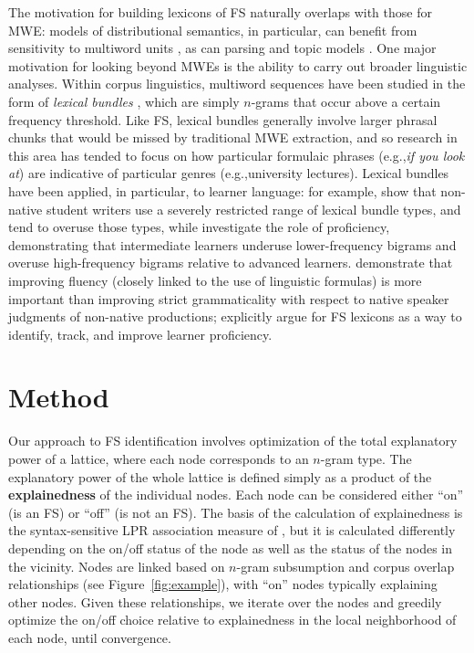 \documentclass[11pt,letterpaper]{article}
\makeatletter
\def \eg {e.g.,\@ }
\newcommand{\termdef}[1]{\textbf{#1}\xspace}
\newcommand{\figref}[2][]{Figure#1~\ref{#2}\xspace}
\makeatother
\begin{document}
The motivation for building lexicons of FS naturally overlaps with those for MWE: models of distributional semantics, in particular, can benefit from sensitivity to multiword units \cite{Cohen:Widdows:2009}, as can parsing \cite{Constant16} and topic models \cite{Lau+:2012b}. One major motivation for looking beyond MWEs is the ability to carry out broader linguistic analyses. Within corpus linguistics, multiword sequences have been studied in the form of \textit{lexical bundles} \cite{Biber04}, which are simply $n$-grams that occur above a certain frequency threshold. Like FS, lexical bundles generally involve larger phrasal chunks that would be missed by traditional MWE extraction, and so research in this area has tended to focus on how particular formulaic phrases (\eg \textit{if you look at}) are indicative of particular genres (\eg university lectures). Lexical bundles have been applied, in particular, to learner language: for example,   show that non-native student writers use a severely restricted range of lexical bundle types, and tend to overuse those types, while  investigate the role of proficiency, demonstrating that intermediate learners underuse lower-frequency bigrams and overuse high-frequency bigrams relative to advanced learners.  demonstrate that improving fluency (closely linked to the use of linguistic formulas) is more important than improving strict grammaticality with respect to native speaker judgments of non-native productions;  explicitly argue for FS lexicons as a way to identify, track, and improve learner proficiency.


\section{Method}

Our approach to FS identification involves optimization of the total explanatory power of a lattice, where each node corresponds to an $n$-gram type. The explanatory power of the whole lattice is defined simply as a product of the \termdef{explainedness} of the individual nodes. Each node can be considered either ``on'' (is an FS) or ``off'' (is not an FS). The basis of the calculation of explainedness is the syntax-sensitive LPR association measure of , but it is calculated differently depending on the on/off status of the node as well as the status of the nodes in the vicinity. Nodes are linked based on $n$-gram subsumption and corpus overlap relationships (see \figref{fig:example}), with ``on'' nodes typically explaining other nodes.  Given these relationships, we iterate over the nodes and greedily optimize the on/off choice relative to explainedness in the local neighborhood of each node, until convergence.
\end{document}
